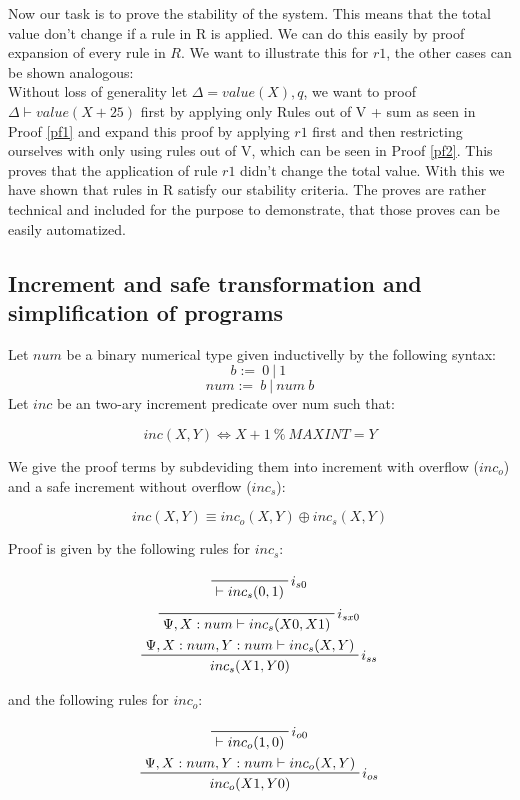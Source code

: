 \documentclass[sigconf]{acmart}
\begin{document}
Now our task is to prove the stability of the system. This means that the total value don't change if a rule in R is applied. We can do this easily by proof expansion of every rule in $R$.
We want to illustrate this for $r1$, the other cases can be shown analogous:
\\
Without loss of generality let $\Delta = value(X), q$, we want to proof $\Delta \vdash value(X + 25)$ first by applying only Rules out of V + sum as seen in Proof \ref{pf1} and expand this proof by applying $r1$ first and then restricting ourselves with only using rules out of V, which can be seen in Proof \ref{pf2}. This proves that the application of rule $r1$ didn't change the total value.
With this we have shown that rules in R satisfy our stability criteria.
The proves are rather technical and included for the purpose to demonstrate, that those proves can be easily automatized.

\subsection*{Increment and safe transformation and simplification of programs}

Let $num$ be a binary numerical type given inductivelly by the following syntax:
\[ b :=\ 0\ |\ 1\ \]
\[ num :=\ b\ |\ num\ b \]
Let $inc$ be an two-ary increment predicate over num such that:

\[ inc(X, Y) \Leftrightarrow X + 1\ \%\ MAXINT = Y \]

We give the proof terms by subdeviding them into increment with overflow ($inc_o$) and a safe increment without overflow ($inc_s$):

\[ inc(X, Y) \equiv inc_o(X, Y) \oplus inc_s(X, Y)\]

Proof is given by the following rules for $inc_s$:

\begin{gather*}
  \prftree[r]{$i_{s0}$}{\vdash inc_s(0, 1)} \\
  \prftree[r]{$i_{sx0}$}{\Psi, X:num \vdash inc_s(X0, X1)} \\
  \prftree[r]{$i_{ss}$}{\Psi, X:num, Y:num \vdash inc_s(X,Y)}{inc_s(X1, Y0)}
\end{gather*}


and the following rules for $inc_o$:

\begin{gather*}
  \prftree[r]{$i_{o0}$}{\vdash inc_o(1,0)} \\
  \prftree[r]{$i_{os}$}{\Psi, X:num, Y:num \vdash inc_o(X,Y)}{inc_o(X1, Y0)}
\end{gather*}
\end{document}
